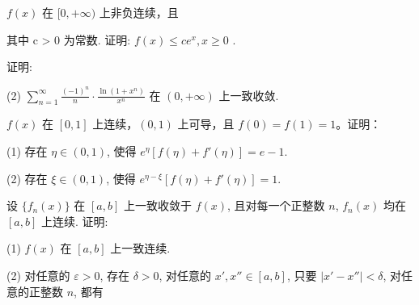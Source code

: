 \par{}
$f(x)$ 在 $[0, +\infty)$ 上非负连续，且\par
\nopagebreak[4]
其中 c > 0 为常数. 证明:  $f(x) \leq ce^{x}, x \geq 0$ .\par
\par{}
证明:\par
\nopagebreak[4]
(2) $\sum_{n=1}^{\infty} \frac{(-1)^n}{n} \cdot \frac{\ln(1 + x^n)}{x^n}$ 在 $(0, +\infty)$ 上一致收敛.\par
$f(x)$ 在 $[0,1]$ 上连续，$(0,1)$ 上可导，且 $f(0) = f(1) = 1$。证明：\par
(1) 存在 $\eta \in (0,1)$, 使得 $e^{\eta}[f(\eta) + f'(\eta)] = e - 1$.\par
(2) 存在 $\xi \in (0,1)$, 使得 $e^{\eta - \xi}[f(\eta) + f'(\eta)] = 1$.\par
设 $\{f_n(x)\}$ 在 $[a, b]$ 上一致收敛于 $f(x)$, 且对每一个正整数 $n$, $f_n(x)$ 均在 $[a, b]$ 上连续. 证明:\par
(1) $f(x)$ 在 $[a, b]$ 上一致连续.\par
\par{}
(2) 对任意的 $\varepsilon > 0$, 存在 $\delta > 0$, 对任意的 $x', x'' \in [a, b]$, 只要 $|x' - x''| < \delta$, 对任意的正整数 $n$, 都有\par
\nopagebreak[4]
